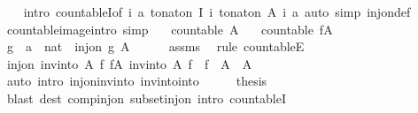 \begin{isabellebody}
%
\isadelimproof
\ \ %
\endisadelimproof
%
\isatagproof
{}\isamarkupfalse%
\ {\isacharparenleft}intro\ countableI{\isacharprime}{\isacharbrackleft}of\ {\isachardoublequoteopen}{\isasymlambda}{\isacharparenleft}i{\isacharcomma}\ a{\isacharparenright}{\isachardot}\ {\isacharparenleft}to{\isacharunderscore}nat{\isacharunderscore}on\ I\ i{\isacharcomma}\ to{\isacharunderscore}nat{\isacharunderscore}on\ {\isacharparenleft}A\ i{\isacharparenright}\ a{\isacharparenright}{\isachardoublequoteclose}{\isacharbrackright}{\isacharparenright}\ {\isacharparenleft}auto\ simp{\isacharcolon}\ inj{\isacharunderscore}on{\isacharunderscore}def{\isacharparenright}%
\endisatagproof
{\isafoldproof}%
%
\isadelimproof
\isanewline
%
\endisadelimproof
\isanewline
{}\isamarkupfalse%
\ countable{\isacharunderscore}image{\isacharbrackleft}intro{\isacharcomma}\ simp{\isacharbrackright}{\isacharcolon}\isanewline
\ \ \ {\isachardoublequoteopen}countable\ A{\isachardoublequoteclose}\isanewline
\ \ \ {\isachardoublequoteopen}countable\ {\isacharparenleft}f{\isacharbackquote}A{\isacharparenright}{\isachardoublequoteclose}\isanewline
%
\isadelimproof
%
\endisadelimproof
%
\isatagproof
{}\isamarkupfalse%
\ {\isacharminus}\isanewline
\ \ \isamarkupfalse%
\ g\ {\isacharcolon}{\isacharcolon}\ {\isachardoublequoteopen}{\isacharprime}a\ {\isasymRightarrow}\ nat{\isachardoublequoteclose}\ \ {\isachardoublequoteopen}inj{\isacharunderscore}on\ g\ A{\isachardoublequoteclose}\isanewline
\ \ \ \ \isamarkupfalse%
\ assms\ \isamarkupfalse%
\ {\isacharparenleft}rule\ countableE{\isacharparenright}\isanewline
\ \ \isamarkupfalse%
\ \isamarkupfalse%
\ {\isachardoublequoteopen}inj{\isacharunderscore}on\ {\isacharparenleft}inv{\isacharunderscore}into\ A\ f{\isacharparenright}\ {\isacharparenleft}f{\isacharbackquote}A{\isacharparenright}{\isachardoublequoteclose}\ {\isachardoublequoteopen}inv{\isacharunderscore}into\ A\ f\ {\isacharbackquote}\ f\ {\isacharbackquote}\ A\ {\isasymsubseteq}\ A{\isachardoublequoteclose}\isanewline
\ \ \ \ \isamarkupfalse%
\ {\isacharparenleft}auto\ intro{\isacharcolon}\ inj{\isacharunderscore}on{\isacharunderscore}inv{\isacharunderscore}into\ inv{\isacharunderscore}into{\isacharunderscore}into{\isacharparenright}\isanewline
\ \ \isamarkupfalse%
\ \isamarkupfalse%
\ {\isacharquery}thesis\isanewline
\ \ \ \ \isamarkupfalse%
\ {\isacharparenleft}blast\ dest{\isacharcolon}\ comp{\isacharunderscore}inj{\isacharunderscore}on\ subset{\isacharunderscore}inj{\isacharunderscore}on\ intro{\isacharcolon}\ countableI{\isacharparenright}\isanewline

\end{isabellebody}
